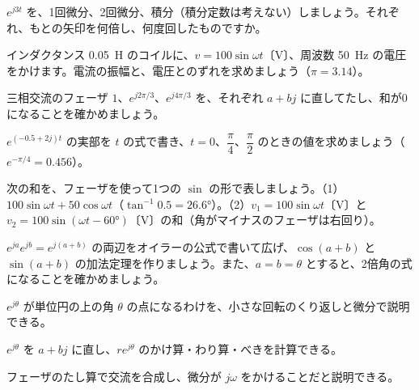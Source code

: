 \bkproblem $e^{j3t}$ を、1回微分、2回微分、積分（積分定数は考えない）しましょう。それぞれ、もとの矢印を何倍し、何度回したものですか。

\bkproblem インダクタンス \qty{0.05}{H} のコイルに、$v=100\sin\omega t$〔V〕、周波数 \qty{50}{Hz} の電圧をかけます。電流の振幅と、電圧とのずれを求めましょう（$\pi=3.14$）。


\bkproblem 三相交流のフェーザ $1$、$e^{j2\pi/3}$、$e^{j4\pi/3}$ を、それぞれ $a+bj$ に直してたし、和が0になることを確かめましょう。

\bkproblem $e^{(-0.5+2j)t}$ の実部を $t$ の式で書き、$t=0$、$\dfrac{\pi}{4}$、$\dfrac{\pi}{2}$ のときの値を求めましょう（$e^{-\pi/4}=0.456$）。

\bkproblem 次の和を、フェーザを使って1つの $\sin$ の形で表しましょう。\newline（1）$100\sin\omega t+50\cos\omega t$（$\tan^{-1}0.5=26.6°$）。\newline（2）$v_1=100\sin\omega t$〔V〕と $v_2=100\sin(\omega t-60°)$〔V〕の和（角がマイナスのフェーザは右回り）。

\bkproblem $e^{ja}e^{jb}=e^{j(a+b)}$ の両辺をオイラーの公式で書いて広げ、$\cos(a+b)$ と $\sin(a+b)$ の加法定理を作りましょう。また、$a=b=\theta$ とすると、2倍角の式になることを確かめましょう。

\begin{furikaeri}
\begin{checklist}
\item $e^{j\theta}$ が単位円の上の角 $\theta$ の点になるわけを、小さな回転のくり返しと微分で説明できる。
\item $e^{j\theta}$ を $a+bj$ に直し、$re^{j\theta}$ のかけ算・わり算・べきを計算できる。
\item フェーザのたし算で交流を合成し、微分が $j\omega$ をかけることだと説明できる。
\end{checklist}
\end{furikaeri}

